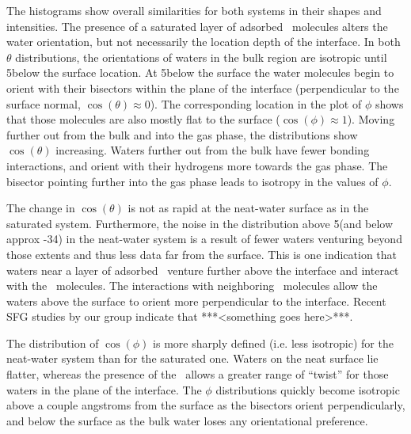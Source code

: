 The histograms show overall similarities for both systems in their shapes and intensities. The presence of a saturated layer of adsorbed \suldiox~molecules alters the water orientation, but not necessarily the location depth of the interface. In both $\theta$ distributions, the orientations of waters in the bulk region are isotropic until 5\angs below the surface location. At 5\angs below the surface the water molecules begin to orient with their bisectors within the plane of the interface (perpendicular to the surface normal, $\cos(\theta)\approx 0$). The corresponding location in the plot of $\phi$ shows that those molecules are also mostly flat to the surface ($\cos(\phi)\approx 1$). Moving further out from the bulk and into the gas phase, the distributions show $\cos(\theta)$ increasing. Waters further out from the bulk have fewer bonding interactions, and orient with their hydrogens more towards the gas phase. The bisector pointing further into the gas phase leads to isotropy in the values of $\phi$.  

The change in $\cos(\theta)$ is not as rapid at the neat-water surface as in the saturated system. Furthermore, the noise in the distribution above 5\angs (and below approx -34\angs) in the neat-water system is a result of fewer waters venturing beyond those extents and thus less data far from the surface. This is one indication that waters near a layer of adsorbed \suldiox~venture further above the interface and interact with the \suldiox~molecules. The interactions with neighboring \suldiox~molecules allow the waters above the surface to orient more perpendicular to the interface. Recent SFG studies by our group indicate that ***<something goes here>***.

The distribution of $\cos(\phi)$ is more sharply defined (i.e. less isotropic) for the neat-water system than for the saturated one. Waters on the neat surface lie flatter, whereas the presence of the \suldiox~allows a greater range of ``twist'' for those waters in the plane of the interface. The $\phi$ distributions quickly become isotropic above a couple angstroms from the surface as the bisectors orient perpendicularly, and below the surface as the bulk water loses any orientational preference.



